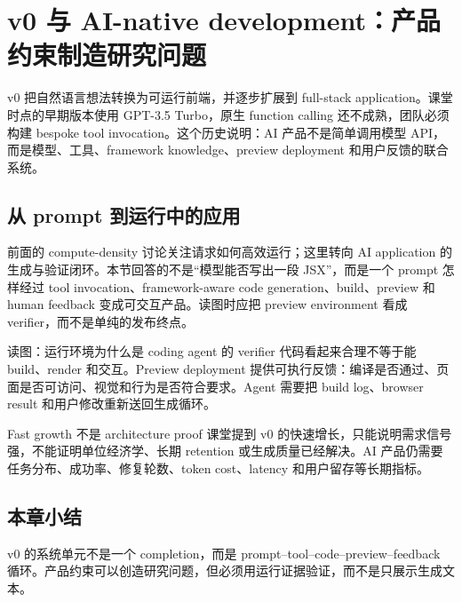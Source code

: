 \section{v0 与 AI-native development：产品约束制造研究问题}

v0 把自然语言想法转换为可运行前端，并逐步扩展到 full-stack application。课堂时点的早期版本使用 GPT-3.5 Turbo，原生 function calling 还不成熟，团队必须构建 bespoke tool invocation。这个历史说明：AI 产品不是简单调用模型 API，而是模型、工具、framework knowledge、preview deployment 和用户反馈的联合系统。

\subsection{从 prompt 到运行中的应用}

前面的 compute-density 讨论关注请求如何高效运行；这里转向 AI application 的生成与验证闭环。本节回答的不是“模型能否写出一段 JSX”，而是一个 prompt 怎样经过 tool invocation、framework-aware code generation、build、preview 和 human feedback 变成可交互产品。读图时应把 preview environment 看成 verifier，而不是单纯的发布终点。


\begin{knowledgebox}{读图：运行环境为什么是 coding agent 的 verifier}
代码看起来合理不等于能 build、render 和交互。Preview deployment 提供可执行反馈：编译是否通过、页面是否可访问、视觉和行为是否符合要求。Agent 需要把 build log、browser result 和用户修改重新送回生成循环。
\end{knowledgebox}

\begin{warningbox}{Fast growth 不是 architecture proof}
课堂提到 v0 的快速增长，只能说明需求信号强，不能证明单位经济学、长期 retention 或生成质量已经解决。AI 产品仍需要任务分布、成功率、修复轮数、token cost、latency 和用户留存等长期指标。
\end{warningbox}


\subsection{本章小结}

v0 的系统单元不是一个 completion，而是 prompt--tool--code--preview--feedback 循环。产品约束可以创造研究问题，但必须用运行证据验证，而不是只展示生成文本。

